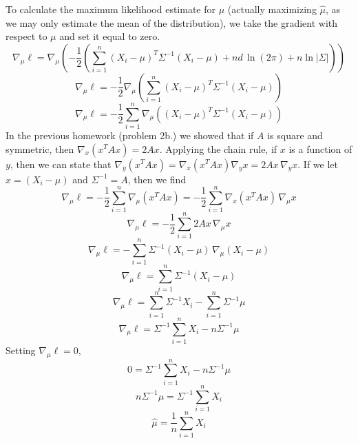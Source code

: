 \documentclass{report}
\begin{document}
To calculate the maximum likelihood estimate for $\mu$ (actually maximizing $\hat{\mu}$, as we may only estimate the mean of the distribution), we take the gradient with respect to $\mu$ and set it equal to zero.
$$ \nabla_{\mu}\ell = \nabla_{\mu}\left( -\frac{1}{2}\left(\sum_{i=1}^n{(X_i-\mu)^T\Sigma^{-1}(X_i-\mu)} + nd\,{\ln (2\pi)} + n\ln |\Sigma| \right) \right) $$
$$ \nabla_{\mu}\ell = -\frac{1}{2}\nabla_{\mu}\left(\sum_{i=1}^n{(X_i-\mu)^T\Sigma^{-1}(X_i-\mu)} \right) $$
$$ \nabla_{\mu}\ell = -\frac{1}{2}\sum_{i=1}^n{\nabla_{\mu}\left((X_i-\mu)^T\Sigma^{-1}(X_i-\mu)\right)} $$
In the previous homework (problem 2b.) we showed that if $A$ is square and symmetric, then $ \nabla_x(x^TAx) = 2Ax $. Applying the chain rule, if $x$ is a function of $y$, then we can state that $\nabla_y(x^TAx) = \nabla_x(x^TAx)\nabla_y x = 2Ax\, \nabla_y x$. If we let $x = (X_i-\mu)$ and $\Sigma^{-1} = A$, then we find 
$$ \nabla_{\mu}\ell = -\frac{1}{2}\sum_{i=1}^n{\nabla_{\mu}(x^TAx)} = -\frac{1}{2}\sum_{i=1}^n{\nabla_{x}(x^TAx)\,\nabla_{\mu}x} $$
$$ \nabla_{\mu}\ell = -\frac{1}{2}\sum_{i=1}^n{2Ax\,\nabla_{\mu}x} $$
$$ \nabla_{\mu}\ell = -\sum_{i=1}^n{\Sigma^{-1} (X_i-\mu)\,\nabla_{\mu}(X_i-\mu)} $$
$$ \nabla_{\mu}\ell = \sum_{i=1}^n{\Sigma^{-1} (X_i-\mu)} $$
$$ \nabla_{\mu}\ell = \sum_{i=1}^n{\Sigma^{-1}X_i}-\sum_{i=1}^n{\Sigma^{-1}\mu} $$
$$ \nabla_{\mu}\ell = \Sigma^{-1}\sum_{i=1}^n{X_i}-n\Sigma^{-1}\mu $$
Setting $\nabla_{\mu}\ell = 0,$
$$ 0 = \Sigma^{-1}\sum_{i=1}^n{X_i}-n\Sigma^{-1}\mu $$
$$ n\Sigma^{-1}\mu = \Sigma^{-1}\sum_{i=1}^n{X_i} $$
$$\boxed{ \hat{\mu} = \frac{1}{n}\sum_{i=1}^n{X_i} }$$
\end{document}
